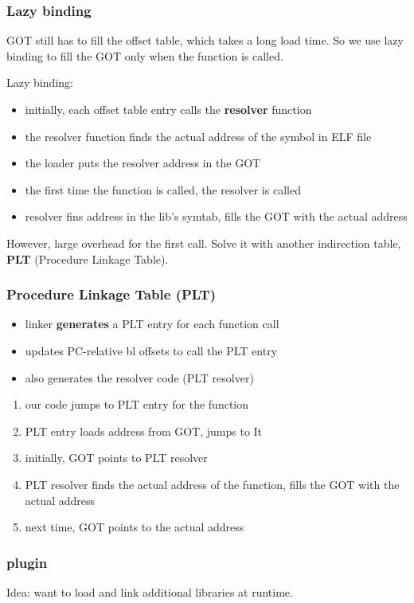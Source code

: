 \documentclass[letterpaper,12pt]{article}
\begin{document}
\subsubsection{Lazy binding}
GOT still has to fill the offset table, which takes a long load time. So we use lazy binding to fill the GOT only when the function is called.

Lazy binding:\begin{itemize}
    \item initially, each offset table entry calls the \textbf{resolver} function
    \item the resolver function finds the actual address of the symbol in ELF file
    \item the loader puts the resolver address in the GOT
    \item the first time the function is called, the resolver is called
    \item resolver fins address in the lib's symtab, fills the GOT with the actual address
\end{itemize}
However, large overhead for the first call. Solve it with another indirection table, \textbf{PLT} (Procedure Linkage Table).
\subsubsection{Procedure Linkage Table (PLT)}
\begin{itemize}
    \item linker \textbf{generates} a PLT entry for each function call
    \item updates PC-relative bl offsets to call the PLT entry
    \item also generates the resolver code (PLT resolver)
\end{itemize}
\begin{enumerate}
    \item our code jumps to PLT entry for the function
    \item PLT entry loads address from GOT, jumps to It
    \item initially, GOT points to PLT resolver
    \item PLT resolver finds the actual address of the function, fills the GOT with the actual address
    \item next time, GOT points to the actual address
\end{enumerate}
\subsubsection{plugin}
Idea: want to load and link additional libraries at runtime.
\end{document}
